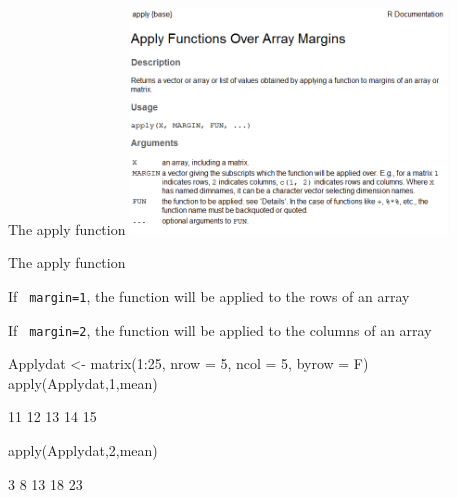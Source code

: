 \documentclass[11pt,german,hideothersubsections]{beamer}
\newcommand{\R}[1]{{\tt \color{blue}  #1}}
\begin{document}
\begin{frame}[fragile]{The apply function}
\includegraphics[width=\textwidth, height=6cm]{../../../tutorial/figure/FunctionApply.PNG}
\end{frame}
\begin{frame}[fragile]{The apply function}
\footnotesize{
\begin{itemize}\footnotesize{
\item If \R{margin=1}, the function will be applied to the rows of an array
\item If \R{margin=2}, the function will be applied to the columns of an array
}
\end{itemize}
\vspace{.5cm}
\pause
\begin{Schunk}
\begin{Sinput}
 Applydat <- matrix(1:25, nrow = 5, ncol = 5, byrow = F)
 apply(Applydat,1,mean)
\end{Sinput}
\begin{Soutput}
[1] 11 12 13 14 15
\end{Soutput}
\begin{Sinput}
 apply(Applydat,2,mean)
\end{Sinput}
\begin{Soutput}
[1]  3  8 13 18 23
\end{Soutput}
\end{Schunk}
}
\end{frame}
\end{document}
